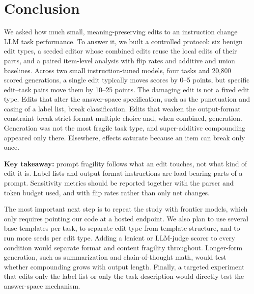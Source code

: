 \section{Conclusion}
\label{sec:conclusion}

We asked how much small, meaning-preserving edits to an instruction change LLM task performance. To answer it, we built a controlled protocol: six benign edit types, a seeded editor whose combined edits reuse the local edits of their parts, and a paired item-level analysis with flip rates and additive and union baselines. Across two small instruction-tuned models, four tasks and 20,800 scored generations, a single edit typically moves scores by 0--5 points, but specific edit--task pairs move them by 10--25 points. The damaging edit is not a fixed edit type. Edits that alter the answer-space specification, such as the punctuation and casing of a label list, break classification. Edits that weaken the output-format constraint break strict-format multiple choice and, when combined, generation. Generation was not the most fragile task type, and super-additive compounding appeared only there. Elsewhere, effects saturate because an item can break only once.

{\bf Key takeaway:} prompt fragility follows what an edit touches, not what kind of edit it is. Label lists and output-format instructions are load-bearing parts of a prompt. Sensitivity metrics should be reported together with the parser and token budget used, and with flip rates rather than only net changes.

 The most important next step is to repeat the study with frontier models, which only requires pointing our code at a hosted endpoint. We also plan to use several base templates per task, to separate edit type from template structure, and to run more seeds per edit type. Adding a lenient or LLM-judge scorer to every condition would separate format and content fragility throughout. Longer-form generation, such as summarization and chain-of-thought math, would test whether compounding grows with output length. Finally, a targeted experiment that edits only the label list or only the task description would directly test the answer-space mechanism.
